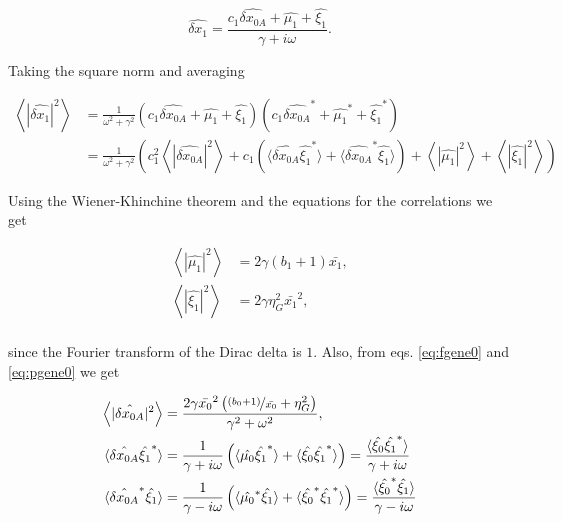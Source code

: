 \begin{equation*}
  \hat{\delta x_1}=\frac{c_1\hat{\delta x_{0A}}+\hat{\mu_1}+\hat{\xi_1}}{\gamma + i\omega}.
\end{equation*}

Taking the square norm and averaging

\begin{equation}
  \label{eq:pgene1}
  \begin{split}
    \left\langle|\hat{\delta x_1}|^2\right\rangle &= \frac{1}{\omega^2+\gamma^2}\left(c_1\hat{\delta x_{0A}} + \hat{\mu_1} + \hat{\xi_1}\right)\left(c_1\hat{\delta x_{0A}}^* + \hat{\mu_1}^* + \hat{\xi_1}^*\right)\\
    &=\frac{1}{\omega^2+\gamma^2}\left(c_1^2 \left\langle|\hat{\delta x_{0A}}|^2\right\rangle + c_1\left(\langle\hat{\delta x_{0A}}\hat{\xi_1}^*\rangle+\langle\hat{\delta x_{0A}}^*\hat{\xi_1}\rangle\right) +  \left\langle|\hat{\mu_1}|^2\right\rangle +  \left\langle|\hat{\xi_1}|^2\right\rangle\right)
  \end{split}
\end{equation}

Using the Wiener-Khinchine theorem and the equations for the correlations we get

\begin{align}
  \left\langle|\hat{\mu_1}|^2\right\rangle &= 2\gamma(b_1+1)\bar{x_1},\\
  \left\langle|\hat{\xi_1}|^2\right\rangle &= 2\gamma\eta_G^2\bar{x_1}^2,\\
\end{align}

since the Fourier transform of the Dirac delta is $1$. Also, from eqs. \ref{eq:fgene0} and \ref{eq:pgene0} we get

\begin{align}
\left\langle|\hat{\delta x_{0A}}|^2\right\rangle &= \frac{2\gamma\bar{x_0}^2\left(\nicefrac{(b_0+1)}{\bar{x_0}}+ \eta_G^2\right)}{\gamma^2+\omega^2},\\
\langle\hat{\delta x_{0A}}\hat{\xi_1}^*\rangle &= \frac{1}{\gamma+i\omega}\left(\langle\hat{\mu_0}\hat{\xi_1}^*\rangle + \langle\hat{\xi_0}\hat{\xi_1}^*\rangle \right) = \frac{\langle\hat{\xi_0}\hat{\xi_1}^*\rangle}{\gamma+i\omega}\\
\langle\hat{\delta x_{0A}}^*\hat{\xi_1}\rangle &= \frac{1}{\gamma-i\omega}\left(\langle\hat{\mu_0}^*\hat{\xi_1}\rangle + \langle\hat{\xi_0}^*\hat{\xi_1}^*\rangle \right) = \frac{\langle\hat{\xi_0}^*\hat{\xi_1}\rangle}{\gamma-i\omega}
\end{align}

